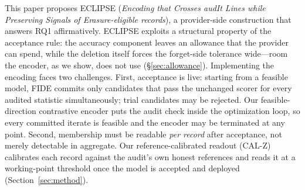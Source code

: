 \documentclass[lettersize,journal]{IEEEtran}
\begin{document}
This paper proposes ECLIPSE (\emph{Encoding that Crosses audIt
Lines while Preserving Signals of Erasure-eligible records}), a
provider-side construction that answers RQ1 affirmatively.
ECLIPSE exploits a structural property of the
acceptance rule: the accuracy component leaves an allowance that
the provider can spend, while the deletion itself forces the
forget-side tolerance wide---room the encoder, as we show,
does not use (\S\ref{sec:allowance}). Implementing the
encoding faces two challenges. First, acceptance is live:
starting from a feasible model, FIDE commits only candidates
that pass the unchanged scorer for every audited statistic
simultaneously; trial candidates may be rejected. Our
feasible-direction contrastive encoder puts the audit
check inside the optimization loop, so every committed
iterate is feasible and the encoder may be terminated at any
point. Second, membership must be readable \emph{per record}
after acceptance, not merely detectable in aggregate. Our
reference-calibrated readout (CAL-Z) calibrates each record
against the audit's own honest references and reads it at a
working-point threshold once the model is accepted and
deployed (Section~\ref{sec:method}).
\end{document}
